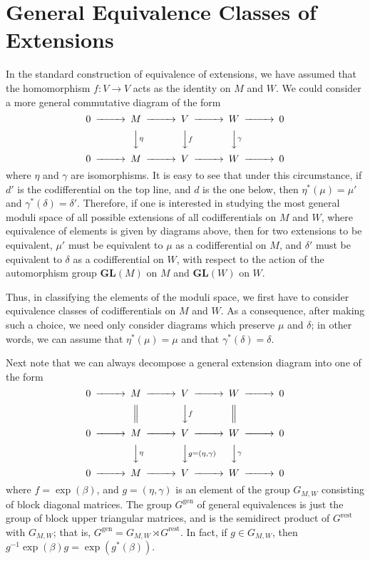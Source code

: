 \documentclass[12pt]{amsart}
\theoremstyle{definition}
\begin{document}
\section{General Equivalence Classes of Extensions}\label{sec7}
In the standard construction of equivalence of extensions, we have assumed that the homomorphism
$f:V{\rightarrow} V$ acts as the identity on $M$ and $W$.  We could consider a more general commutative
diagram of the form
$$
\begin{CD}
0@>>>M@>>>V@>>>W@>>>0\\
@.@VV\eta V@VVfV@VV\gamma V\\
0@>>>M@>>>V@>>>W@>>>0\\
\end{CD}
$$
where $\eta$ and $\gamma$ are isomorphisms.  It is easy to see
that under this circumstance, if $d'$ is the codifferential on the
top line, and $d$ is the one below, then $\eta^*(\mu)=\mu'$ and
$\gamma^*(\delta)=\delta'$.  Therefore, if one is interested in
studying the most general moduli space of all possible extensions
of all codifferentials on $M$ and $W$, where equivalence of
elements is given by diagrams above, then for two extensions to be
equivalent, $\mu'$ must be equivalent to $\mu$ as a codifferential
on $M$, and $\delta'$ must be equivalent to $\delta$ as a
codifferential on $W$, with respect to the action of the
automorphism group ${{\mathbf{GL}}}(M)$ on $M$ and ${{\mathbf{GL}}}(W)$ on $W$.

Thus, in classifying the elements of the moduli space, we first
have to consider equivalence classes of codifferentials on $M$ and
$W$. As a consequence, after making such a choice,  we need only
consider diagrams which preserve $\mu$ and $\delta$;  in other
words, we can assume  that $\eta^*(\mu)=\mu$ and  that
$\gamma^*(\delta)=\delta$.

Next note that we can always decompose a general extension diagram into one of the form
$$
\begin{CD}
0@>>>M@>>>V@>>>W@>>>0\\
@.@|@VVfV@|\\
0@>>>M@>>>V@>>>W@>>>0\\
@.@VV\eta V@VVg=(\eta,\gamma)V@VV\gamma V\\
0@>>>M@>>>V@>>>W@>>>0\\
\end{CD}
$$
where $f=\exp(\beta)$, and $g=(\eta,\gamma)$ is an element of the
group ${\mbox{$G_{M,W}$}}$ consisting of block diagonal matrices. The group
${\mbox{$G^{\text{gen}}$}}$ of general equivalences is just the group of block upper
triangular matrices, and is the semidirect product of ${\mbox{$G^{\text{rest}}$}}$
with ${\mbox{$G_{M,W}$}}$; that is, ${\mbox{$G^{\text{gen}}$}}={\mbox{$G_{M,W}$}}\rtimes{\mbox{$G^{\text{rest}}$}}$. In fact, if
$g\in{\mbox{$G_{M,W}$}}$, then $g{^{-1}}\exp(\beta)g=\exp(g^*(\beta))$.
\end{document}
